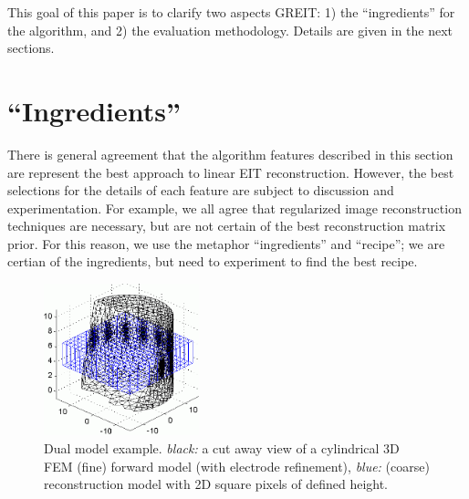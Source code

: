 \documentclass[letterpaper,twocolumn,11pt]{article}
\begin{document}
This goal of this paper is to clarify two aspects GREIT:
1) the ``ingredients'' for the algorithm, and
2) the evaluation methodology. Details are given in the
next sections.

\section{``Ingredients''}

There is general agreement that the algorithm features
described in this section are represent the best approach
to linear EIT reconstruction. However, the best selections
for the details of each feature are subject to discussion
and experimentation. For example, we all agree that
regularized image reconstruction techniques are necessary,
but are not certain of the best reconstruction matrix prior.
For this reason, we use the metaphor ``ingredients'' and
``recipe''; we are certian of the ingredients, but need
to experiment to find the best recipe.
\begin{figure}[tbh]
\begin{center}
 \includegraphics[width= 0.4\textwidth, bb=0 0 427 419]{figs/square_mesh03a.png}
\caption{ \label{fig:dual_model}
\small
Dual model example. {\em black:} a cut away view of a
cylindrical 3D FEM (fine) forward model (with electrode
 refinement),
{\em blue:} (coarse) reconstruction model with 2D square
pixels of defined height.%
\vspace{-0.5cm}
}
\end{center}
\end{figure}
\end{document}
